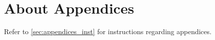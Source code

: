 \section{About Appendices}

Refer to \cref{sec:appendices_inst} for instructions regarding appendices.
